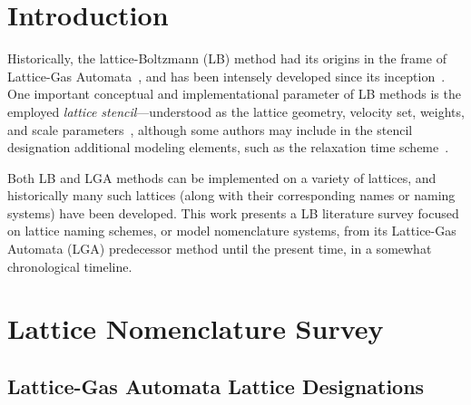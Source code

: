 \section{Introduction}

    Historically,   the   lattice-Boltzmann   (LB)    method    had    its    origins    in    the    frame    of    Lattice-Gas
    Automata~\cite{1988-McNamaraGR+ZanettiG-PhysRevLett},     and     has     been     intensely     developed     since     its
    inception~\cite{1992-BenziR+VergassolaM-PhysRep,       1998-ChenS+DoolenGD-AnnuRevFluidMech,        2011-MohamadAA-Springer,
    2018-KrugerT+ViggenEM-Springer}. One important conceptual and implementational parameter  of  LB  methods  is  the  employed
    \emph{lattice    stencil}---understood    as    the    lattice    geometry,    velocity    set,    weights,    and     scale
    parameters~\cite{2013-HegeleJr+PhilippiPC-JSciComput,                                2013-MattilaKK+PhilippiPC-IntJModPhysC,
    2014-MattilaKK+PhilippiPC-SciWorldJ}, although some authors may include  in  the  stencil  designation  additional  modeling
    elements, such as the relaxation time scheme~\cite{2017-LiL+KlausnerJF-IntJHeatMassTran}.

    Both LB and LGA methods can be implemented on a variety of lattices, and historically many such lattices (along  with  their
    corresponding names or naming systems) have been developed. This work presents a LB literature  survey  focused  on  lattice
    naming schemes, or model nomenclature systems, from its Lattice-Gas Automata (LGA)  predecessor  method  until  the  present
    time, in a somewhat chronological timeline.



\section{Lattice Nomenclature Survey}

    \subsection{Lattice-Gas Automata Lattice Designations}

